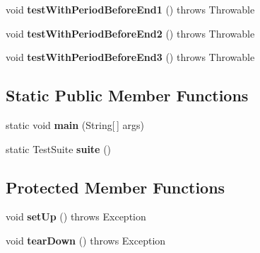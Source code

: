 \begin{DoxyCompactItemize}
\item 
\hypertarget{classorg_1_1joda_1_1time_1_1_test_interval___basics_ade328d2b378f77a51a46e3d619d7d17b}{void {\bfseries test\-With\-Period\-Before\-End1} ()  throws Throwable }\label{classorg_1_1joda_1_1time_1_1_test_interval___basics_ade328d2b378f77a51a46e3d619d7d17b}

\item 
\hypertarget{classorg_1_1joda_1_1time_1_1_test_interval___basics_a8dc8674628eca993d2ec5294ffb6c0e6}{void {\bfseries test\-With\-Period\-Before\-End2} ()  throws Throwable }\label{classorg_1_1joda_1_1time_1_1_test_interval___basics_a8dc8674628eca993d2ec5294ffb6c0e6}

\item 
\hypertarget{classorg_1_1joda_1_1time_1_1_test_interval___basics_a4c2e29c097cf33ffcdf632add85b8d43}{void {\bfseries test\-With\-Period\-Before\-End3} ()  throws Throwable }\label{classorg_1_1joda_1_1time_1_1_test_interval___basics_a4c2e29c097cf33ffcdf632add85b8d43}

\end{DoxyCompactItemize}
\subsection*{Static Public Member Functions}
\begin{DoxyCompactItemize}
\item 
\hypertarget{classorg_1_1joda_1_1time_1_1_test_interval___basics_ac8e3ff41633285618f187d1669d808a8}{static void {\bfseries main} (String\mbox{[}$\,$\mbox{]} args)}\label{classorg_1_1joda_1_1time_1_1_test_interval___basics_ac8e3ff41633285618f187d1669d808a8}

\item 
\hypertarget{classorg_1_1joda_1_1time_1_1_test_interval___basics_abaa38a80aa63a66f498e238895963c2d}{static Test\-Suite {\bfseries suite} ()}\label{classorg_1_1joda_1_1time_1_1_test_interval___basics_abaa38a80aa63a66f498e238895963c2d}

\end{DoxyCompactItemize}
\subsection*{Protected Member Functions}
\begin{DoxyCompactItemize}
\item 
\hypertarget{classorg_1_1joda_1_1time_1_1_test_interval___basics_a73037ac2f311ea35b4a3be068305e25e}{void {\bfseries set\-Up} ()  throws Exception }\label{classorg_1_1joda_1_1time_1_1_test_interval___basics_a73037ac2f311ea35b4a3be068305e25e}

\item 
\hypertarget{classorg_1_1joda_1_1time_1_1_test_interval___basics_a6f8db57fea5f9ccfe473265380acda2a}{void {\bfseries tear\-Down} ()  throws Exception }\label{classorg_1_1joda_1_1time_1_1_test_interval___basics_a6f8db57fea5f9ccfe473265380acda2a}

\end{DoxyCompactItemize}


